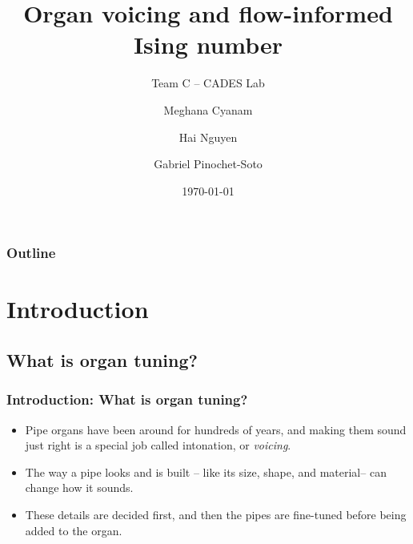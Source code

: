 \documentclass{beamer}
\title{Organ voicing and flow-informed Ising number}
\subtitle{Team C -- CADES Lab}
\author[Cyanam, Nguyen, Pinochet-Soto]{Meghana Cyanam \and Hai Nguyen \and Gabriel Pinochet-Soto}
\institute{Portland State University}
\date{\today}
\begin{document}
    {
    \begin{frame}
		\titlepage
	\end{frame}
    }

    \begin{frame}
        \frametitle{Outline}
        \tableofcontents
    \end{frame}

    \section{Introduction}
    \subsection{What is organ tuning?}
	\begin{frame}
        \frametitle{Introduction: What is organ tuning?}
		\begin{itemize}
            \item
                Pipe organs have been around for hundreds of years, and making them sound just
                right is a special job called intonation, or \emph{voicing}.

			\item
                The way a pipe looks and is built -- like its size, shape, and material-- can
                change how it sounds.

			\item
                These details are decided first, and then the pipes are fine-tuned before being
                added to the organ.
		\end{itemize}
	\end{frame}
\end{document}
